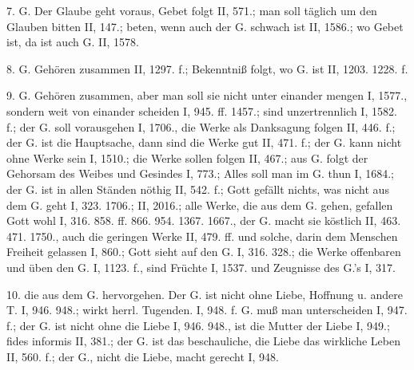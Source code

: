 7. G.  Der Glaube geht voraus, Gebet folgt II, 571.; man soll täglich um den Glauben bitten II, 147.; beten, wenn auch der G. schwach ist II, 1586.; wo Gebet ist, da ist auch G. II, 1578.

8. G.  Gehören zusammen II, 1297. f.; Bekenntniß folgt, wo G. ist II, 1203. 1228. f.

9. G.  Gehören zusammen, aber man soll sie nicht unter einander mengen I, 1577., sondern weit von einander scheiden I, 945. ff. 1457.; sind unzertrennlich I, 1582. f.; der G. soll vorausgehen I, 1706., die Werke als Danksagung folgen II, 446. f.; der G. ist die Hauptsache, dann sind die Werke gut II, 471. f.; der G. kann nicht ohne Werke sein I, 1510.; die Werke sollen folgen II, 467.; aus G. folgt der Gehorsam des Weibes und Gesindes I, 773.; Alles soll man im G. thun I, 1684.; der G. ist in allen Ständen nöthig II, 542. f.; Gott gefällt nichts, was nicht aus dem G. geht I, 323. 1706.; II, 2016.; alle Werke, die aus dem G. gehen, gefallen Gott wohl I, 316. 858. ff. 866. 954. 1367. 1667., der G. macht sie köstlich II, 463. 471. 1750., auch die geringen Werke II, 479. ff. und solche, darin dem Menschen Freiheit gelassen I, 860.; Gott sieht auf den G. I, 316. 328.; die Werke offenbaren und üben den G. I, 1123. f., sind Früchte I, 1537. und Zeugnisse des G.’s I, 317.

10.  die aus dem G. hervorgehen. Der G. ist nicht ohne Liebe, Hoffnung u. andere T. I, 946. 948.; wirkt herrl. Tugenden. I, 948. f. G.  muß man unterscheiden I, 947. f.; der G. ist nicht ohne die Liebe I, 946. 948., ist die Mutter der Liebe I, 949.; fides informis II, 381.; der G. ist das beschauliche, die Liebe das wirkliche Leben II, 560. f.; der G., nicht die Liebe, macht gerecht I, 948.

